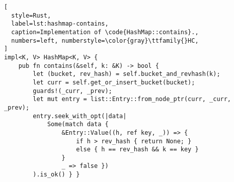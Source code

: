 \begin{lstlisting}[
  style=Rust,
  label=lst:hashmap-contains,
  caption=Implementation of \code{HashMap::contains}.,
  numbers=left, numberstyle=\color{gray}\ttfamily{}HC,
]
impl<K, V> HashMap<K, V> {
    pub fn contains(&self, k: &K) -> bool {
        let (bucket, rev_hash) = self.bucket_and_revhash(k);
        let curr = self.get_or_insert_bucket(bucket);
        guards!(_curr, _prev);
        let mut entry = list::Entry::from_node_ptr(curr, _curr, _prev);
        entry.seek_with_opt(|data|
            Some(match data {
                &Entry::Value((h, ref key, _)) => {
                    if h > rev_hash { return None; }
                    else { h == rev_hash && k == key }
                }
                _ => false })
        ).is_ok() } }
\end{lstlisting}
